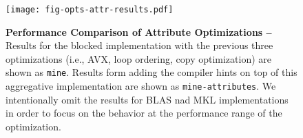
\begin{figure}[b]

  \centering
  \texttt{[image: fig-opts-attr-results.pdf]}

  \caption{\textbf{Performance Comparison of Attribute Optimizations --}
    Results for the blocked implementation with the previous three
    optimizations (i.e., AVX, loop ordering, copy optimization) are shown
    as {\tt{mine}}. Results form adding the compiler hints on top of this
    aggregative implementation are shown as {\tt{mine-attributes}}.  We
    intentionally omit the results for BLAS nad MKL implementations in
    order to focus on the behavior at the performance range of the
    optimization.}

  \label{fig-opts-attr-results}

\end{figure}
